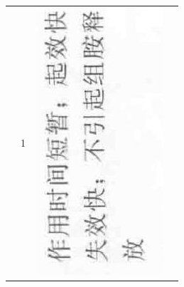 \documentclass[10pt]{article}
\begin{document}
\begin{center}
\begin{tabular}{|c|c|c|c|}
 & 1 & \includegraphics[max width=\textwidth]{2024_07_05_645bb794a4d4f32ee0c8g-332(6)}

\end{tabular}
\end{center}
\end{document}
